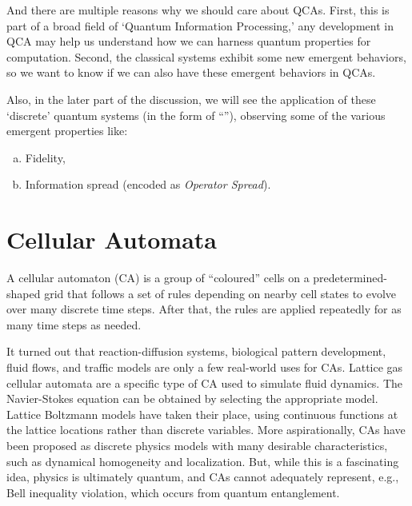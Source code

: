 \documentclass[11pt, oneside, listof=totoc]{scrbook}
\begin{document}
And there are multiple reasons why we should care about QCAs. First, this is part of a broad field of `Quantum Information Processing,' any development in QCA may help us understand how we can harness quantum properties for computation. Second, the classical systems exhibit some new emergent behaviors, so we want to know if we can also have these emergent behaviors in QCAs.


Also, in the later part of the discussion, we will see the application of these `discrete' quantum systems (in the form of ``''\cite{Fisher2023}), observing some of the various emergent properties like:
\begin{enumerate}[(a), noitemsep]
    \item Fidelity,
    \item Information spread (encoded as \emph{Operator Spread}).
\end{enumerate}

\section{Cellular Automata}

A cellular automaton (CA) is a group of ``coloured'' cells on a predetermined-shaped grid that follows a set of rules depending on nearby cell states to evolve over many discrete time steps. After that, the rules are applied repeatedly for as many time steps as needed.

It turned out that reaction-diffusion systems, biological pattern development, fluid flows, and traffic models are only a few real-world uses for CAs. Lattice gas cellular automata are a specific type of CA used to simulate fluid dynamics. The Navier-Stokes equation can be obtained by selecting the appropriate model. Lattice Boltzmann models have taken their place, using continuous functions at the lattice locations rather than discrete variables. More aspirationally, CAs have been proposed as discrete physics models with many desirable characteristics, such as dynamical homogeneity and localization. But, while this is a fascinating idea, physics is ultimately quantum, and CAs cannot adequately represent, e.g., Bell inequality violation, which occurs from quantum entanglement.
\end{document}
